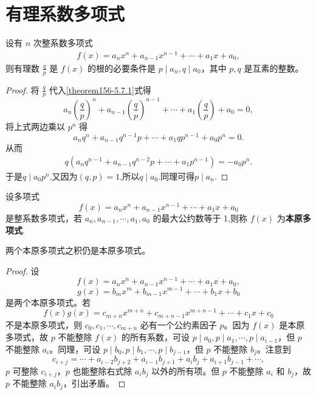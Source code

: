 \documentclass[../../main.tex]{subfiles}%
\begin{document}
\section{有理系数多项式}

\begin{theorem}[整数系数多项式有有理根的必要条件]\label{theorem:整数系数多项式有有理根的必要条件}
设有 \( n \) 次整系数多项式
\begin{align}
f(x) = a_n x^n + a_{n-1} x^{n-1} + \cdots + a_1 x + a_0, \label{theorem156-5.7.1}
\end{align}
则有理数 \( \frac{q}{p} \) 是 \( f(x) \) 的根的必要条件是 \( p \mid a_n, q \mid a_0 \)，其中 \( p, q \) 是互素的整数。
\end{theorem}
\begin{proof}
将 \( \frac{q}{p} \) 代入\eqref{theorem156-5.7.1}式得
\[
a_n \left( \frac{q}{p} \right)^n + a_{n-1} \left( \frac{q}{p} \right)^{n-1} + \cdots + a_1 \left( \frac{q}{p} \right) + a_0 = 0,
\]
将上式两边乘以 \( p^n \) 得
\[
a_n q^n + a_{n-1} q^{n-1} p + \cdots + a_1 q p^{n-1} + a_0 p^n = 0.
\]
从而
\begin{align*}
q\left( a_nq^{n-1}+a_{n-1}q^{n-2}p+\cdots +a_1p^{n-1} \right) =-a_0p^n.
\end{align*}
于是$q\mid a_0p^n$,又因为$(q,p)=1$,所以$q\mid a_0$.同理可得$p \mid a_n$.
\end{proof}

\begin{definition}[本原多项式]
设多项式
\[
f(x) = a_n x^n + a_{n-1} x^{n-1} + \cdots + a_1 x + a_0
\]
是整系数多项式，若 \( a_n, a_{n-1}, \cdots, a_1, a_0 \) 的最大公约数等于 1,则称 \( f(x) \) 为\textbf{本原多项式}.
\end{definition}

\begin{lemma}[Gauss引理]\label{lemma:Gauss引理}
两个本原多项式之积仍是本原多项式。
\end{lemma}
\begin{proof}
设
\[
f(x) = a_n x^n + a_{n-1} x^{n-1} + \cdots + a_1 x + a_0,
\]
\[
g(x) = b_m x^m + b_{m-1} x^{m-1} + \cdots + b_1 x + b_0
\]
是两个本原多项式。若
\[
f(x) g(x) = c_{m+n} x^{m+n} + c_{m+n-1} x^{m+n-1} + \cdots + c_1 x + c_0
\]
不是本原多项式，则 \( c_0, c_1, \cdots, c_{m+n} \) 必有一个公约素因子 \( p \)。因为 \( f(x) \) 是本原多项式，故 \( p \) 不能整除 \( f(x) \) 的所有系数，可设 \( p \mid a_0, p \mid a_1, \cdots, p \mid a_{i-1} \)，但 \( p \) 不能整除 \( a_i \)。同理，可设 \( p \mid b_0, p \mid b_1, \cdots, p \mid b_{j-1} \)，但 \( p \) 不能整除 \( b_j \)。注意到
\[
c_{i+j} = \cdots + a_{i-2} b_{j+2} + a_{i-1} b_{j+1} + a_i b_j + a_{i+1} b_{j-1} + \cdots,
\]
\( p \) 可整除 \( c_{i+j} \)，\( p \) 也能整除右式除 \( a_i b_j \) 以外的所有项。但 \( p \) 不能整除 \( a_i \) 和 \( b_j \)，故 \( p \) 不能整除 \( a_i b_j \)，引出矛盾。
\end{proof}
\end{document}
